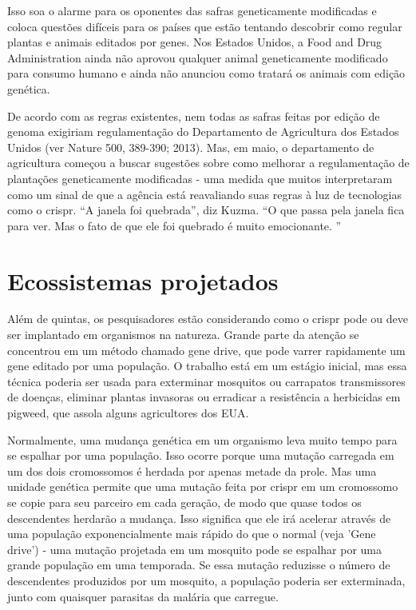 \documentclass{report}
\begin{document}
Isso soa o alarme para os oponentes das safras geneticamente modificadas e coloca questões difíceis para os países que estão tentando descobrir como regular plantas e animais editados por genes. Nos Estados Unidos, a Food and Drug Administration ainda não aprovou qualquer animal geneticamente modificado para consumo humano e ainda não anunciou como tratará os animais com edição genética.

De acordo com as regras existentes, nem todas as safras feitas por edição de genoma exigiriam regulamentação do Departamento de Agricultura dos Estados Unidos (ver Nature 500, 389-390; 2013). Mas, em maio, o departamento de agricultura começou a buscar sugestões sobre como melhorar a regulamentação de plantações geneticamente modificadas - uma medida que muitos interpretaram como um sinal de que a agência está reavaliando suas regras à luz de tecnologias como o \ac{crispr}. “A janela foi quebrada”, diz Kuzma. “O que passa pela janela fica para ver. Mas o fato de que ele foi quebrado é muito emocionante. ”

\section{Ecossistemas projetados}


Além de quintas, os pesquisadores estão considerando como o \ac{crispr} pode ou deve ser implantado em organismos na natureza. Grande parte da atenção se concentrou em um método chamado gene drive, que pode varrer rapidamente um gene editado por uma população. O trabalho está em um estágio inicial, mas essa técnica poderia ser usada para exterminar mosquitos ou carrapatos transmissores de doenças, eliminar plantas invasoras ou erradicar a resistência a herbicidas em pigweed, que assola alguns agricultores dos EUA.

Normalmente, uma mudança genética em um organismo leva muito tempo para se espalhar por uma população. Isso ocorre porque uma mutação carregada em um dos dois cromossomos é herdada por apenas metade da prole. Mas uma unidade genética permite que uma mutação feita por \ac{crispr} em um cromossomo se copie para seu parceiro em cada geração, de modo que quase todos os descendentes herdarão a mudança. Isso significa que ele irá acelerar através de uma população exponencialmente mais rápido do que o normal (veja 'Gene drive') - uma mutação projetada em um mosquito pode se espalhar por uma grande população em uma temporada. Se essa mutação reduzisse o número de descendentes produzidos por um mosquito, a população poderia ser exterminada, junto com quaisquer parasitas da malária que carregue.
\end{document}
